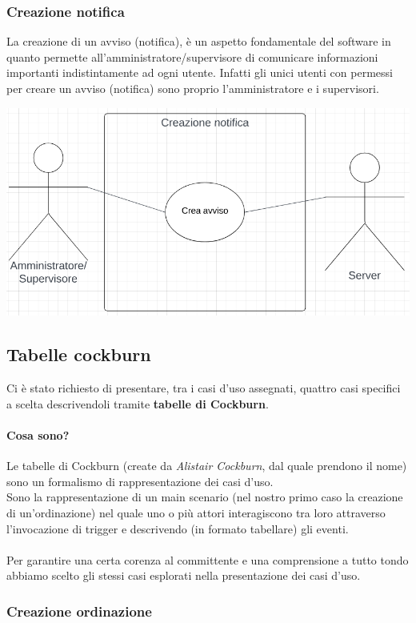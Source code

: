 \subsubsection{Creazione notifica}
La creazione di un avviso (notifica), è un aspetto fondamentale del software in quanto permette all'amministratore/supervisore di comunicare informazioni importanti indistintamente ad ogni utente. Infatti gli unici utenti con permessi per creare un avviso (notifica) sono proprio l'amministratore e i supervisori.
\begin{center}
  \includegraphics[scale=0.6]{img/use_case/use_case-creazione_notifica.png}
\end{center}
\newpage
\subsection{Tabelle cockburn}
Ci è stato richiesto di presentare, tra i casi d'uso assegnati, quattro casi
specifici a scelta descrivendoli tramite \textbf{tabelle di Cockburn}.
\paragraph{Cosa sono?} Le tabelle di Cockburn (create da \textit{Alistair Cockburn}, dal quale prendono il nome) sono un formalismo di rappresentazione dei casi d'uso.\\
Sono la rappresentazione di un main scenario (nel nostro primo caso la creazione di un'ordinazione) nel quale uno o più attori interagiscono
tra loro attraverso l'invocazione di trigger e descrivendo (in formato tabellare) gli eventi.
\\
\\Per garantire una certa corenza al committente e una comprensione a tutto tondo abbiamo scelto gli stessi casi esplorati nella presentazione dei casi d'uso.
\subsubsection{Creazione ordinazione}

